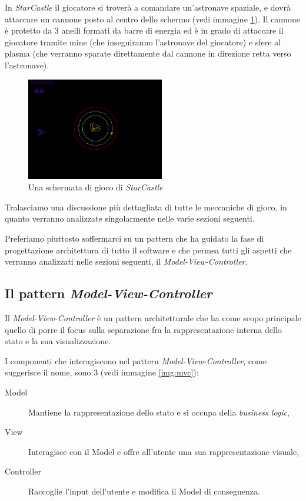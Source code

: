 \documentclass[a4paper,12pt]{article}
\begin{document}
In \emph{StarCastle} il giocatore si trover\`a a comandare un'astronave spaziale, e dovr\`a attaccare un cannone posto al centro dello schermo (vedi immagine \ref{img:screen}). Il cannone \`e protetto da 3 anelli formati da barre di energia ed \`e in grado di attaccare il giocatore tramite mine (che inseguiranno l'astronave del giocatore) e sfere al plasma (che verranno sparate direttamente dal cannone in direzione retta verso l'astronave). 

\begin{figure}
\centering
\includegraphics[width=6cm]{screen.jpg}
\caption{Una schermata di gioco di \emph{StarCastle}}
\label{img:screen}
\end{figure}

Tralasciamo una discussione pi\`u dettagliata di tutte le meccaniche di gioco, in quanto verranno analizzate singolarmente nelle varie sezioni seguenti.

Preferiamo piuttosto soffermarci su un pattern che ha guidato la fase di progettazione architettura di tutto il software e che permea tutti gli aspetti che verranno analizzati nelle sezioni seguenti, il \emph{Model-View-Controller}.

\subsection*{Il pattern \emph{Model-View-Controller}}

Il \emph{Model-View-Controller} \`e un pattern architetturale che ha come scopo principale quello di porre il focus sulla separazione fra la rappresentazione interna dello stato e la sua visualizzazione.

I componenti che interagiscono nel pattern \emph{Model-View-Controller}, come suggerisce il nome, sono 3 (vedi immagine \ref{img:mvc}):

\begin{description}
\item[\textsf{Model}] Mantiene la rappresentazione dello stato e si occupa della \emph{business logic},
\item[\textsf{View}] Interagisce con il \textsf{Model} e offre all'utente una sua rappresentazione visuale,
\item[\textsf{Controller}] Raccoglie l'input dell'utente e modifica il \textsf{Model} di conseguenza.
\end{description}
\end{document}
